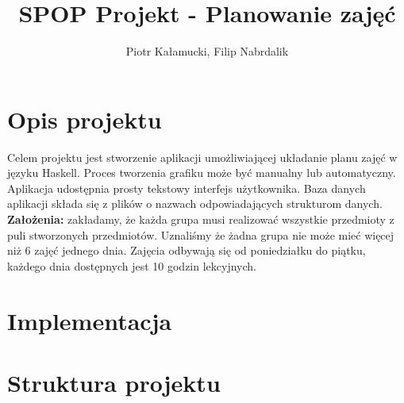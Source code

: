 \documentclass[12pt,a4paper]{article}
\author{Piotr Kałamucki, Filip Nabrdalik}
\title{SPOP Projekt - Planowanie zajęć}
\begin{document}
\maketitle
\thispagestyle{empty}
\pagestyle{empty}
\section{Opis projektu}
Celem projektu jest stworzenie aplikacji umożliwiającej układanie planu zajęć w języku Haskell. Proces tworzenia grafiku może być manualny lub automatyczny. Aplikacja udostępnia prosty tekstowy interfejs użytkownika. Baza danych aplikacji składa się z plików o nazwach odpowiadających strukturom danych.
\textbf{Założenia:} zakładamy, że każda grupa musi realizować wszystkie przedmioty z puli stworzonych przedmiotów. Uznaliśmy że żadna grupa nie może mieć więcej niż 6 zajęć jednego dnia. Zajęcia odbywają się od poniedziałku do piątku, każdego dnia dostępnych jest 10 godzin lekcyjnych.
\section{Implementacja}
\section{Struktura projektu}
\end{document}
